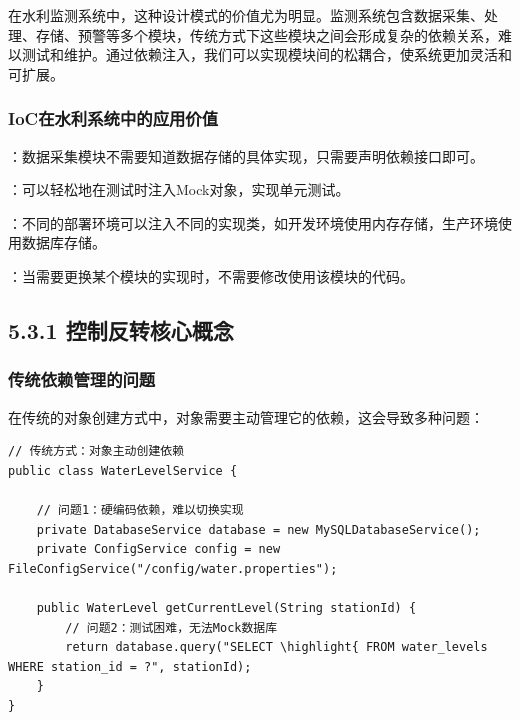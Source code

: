 在水利监测系统中，这种设计模式的价值尤为明显。监测系统包含数据采集、处理、存储、预警等多个模块，传统方式下这些模块之间会形成复杂的依赖关系，难以测试和维护。通过依赖注入，我们可以实现模块间的松耦合，使系统更加灵活和可扩展。

\hypertarget{iocux5728ux6c34ux5229ux7cfbux7edfux4e2dux7684ux5e94ux7528ux4ef7ux503c}{%
\subsubsection{IoC在水利系统中的应用价值}\label{iocux5728ux6c34ux5229ux7cfbux7edfux4e2dux7684ux5e94ux7528ux4ef7ux503c}}

：数据采集模块不需要知道数据存储的具体实现，只需要声明依赖接口即可。

：可以轻松地在测试时注入Mock对象，实现单元测试。

：不同的部署环境可以注入不同的实现类，如开发环境使用内存存储，生产环境使用数据库存储。

：当需要更换某个模块的实现时，不需要修改使用该模块的代码。

\hypertarget{ux63a7ux5236ux53cdux8f6cux6838ux5fc3ux6982ux5ff5}{%
\subsection{5.3.1 控制反转核心概念}\label{ux63a7ux5236ux53cdux8f6cux6838ux5fc3ux6982ux5ff5}}

\hypertarget{ux4f20ux7edfux4f9dux8d56ux7ba1ux7406ux7684ux95eeux9898}{%
\subsubsection{传统依赖管理的问题}\label{ux4f20ux7edfux4f9dux8d56ux7ba1ux7406ux7684ux95eeux9898}}

在传统的对象创建方式中，对象需要主动管理它的依赖，这会导致多种问题：

\begin{lstlisting}[style=java]
// 传统方式：对象主动创建依赖
public class WaterLevelService {
    
    // 问题1：硬编码依赖，难以切换实现
    private DatabaseService database = new MySQLDatabaseService();
    private ConfigService config = new FileConfigService("/config/water.properties");
    
    public WaterLevel getCurrentLevel(String stationId) {
        // 问题2：测试困难，无法Mock数据库
        return database.query("SELECT \highlight{ FROM water_levels WHERE station_id = ?", stationId);
    }
}
\end{lstlisting}

